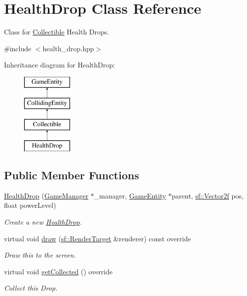 \hypertarget{class_health_drop}{}\section{Health\+Drop Class Reference}
\label{class_health_drop}


Class for \mbox{\hyperlink{class_collectible}{Collectible}} Health Drops.  




{\ttfamily \#include $<$health\+\_\+drop.\+hpp$>$}

Inheritance diagram for Health\+Drop\+:\begin{figure}[H]
\begin{center}
\leavevmode
\includegraphics[height=4.000000cm]{class_health_drop}
\end{center}
\end{figure}
\subsection*{Public Member Functions}
\begin{DoxyCompactItemize}
\item 
\mbox{\hyperlink{class_health_drop_a85bb6964b0457fe4277c3cae7d15a6cb}{Health\+Drop}} (\mbox{\hyperlink{class_game_manager}{Game\+Manager}} $\ast$\+\_\+manager, \mbox{\hyperlink{class_game_entity}{Game\+Entity}} $\ast$parent, \mbox{\hyperlink{classsf_1_1_vector2}{sf\+::\+Vector2f}} pos, float power\+Level)
\begin{DoxyCompactList}\small\item\em Create a new \mbox{\hyperlink{class_health_drop}{Health\+Drop}}. \end{DoxyCompactList}\item 
virtual void \mbox{\hyperlink{class_health_drop_a6df6c3fb2e0509cd550420ed35a8fa12}{draw}} (\mbox{\hyperlink{classsf_1_1_render_target}{sf\+::\+Render\+Target}} \&renderer) const override
\begin{DoxyCompactList}\small\item\em Draw this to the screen. \end{DoxyCompactList}\item 
\mbox{\label{class_health_drop_a89ec3acf3a5b4edb723208e1e1f7e9d5}} 
virtual void \mbox{\hyperlink{class_health_drop_a89ec3acf3a5b4edb723208e1e1f7e9d5}{get\+Collected}} () override
\begin{DoxyCompactList}\small\item\em Collect this Drop. \end{DoxyCompactList}\end{DoxyCompactItemize}
